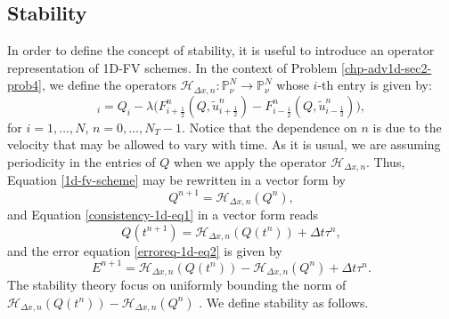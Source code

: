 \subsection{Stability}
\label{chp-adv1d-sub-stability}
In order to define the concept of stability, it is useful to introduce an operator
representation of 1D-FV schemes.
In the context of Problem \ref{chp-adv1d-sec2-prob4}, we define the operators
$\mathcal{H}_{\Delta x,n}: \mathbb{P}^{N}_{\nu} \to \mathbb{P}^{N}_{\nu}$ whose $i$-th entry is given by:
\begin{equation}
	[\mathcal{H}_{\Delta x,n}(Q)]_i = Q_i -
	\lambda \bigg({F}^n_{i+\frac{1}{2}}(Q,\tilde{u}^n_{i+\frac{1}{2}}) 
	- {F}^n_{i-\frac{1}{2}}(Q,\tilde{u}^n_{i-\frac{1}{2}}) \bigg),
\end{equation}
for $i=1, \ldots, N$, $n=0, \ldots, N_T-1$.
Notice that the dependence on $n$ is due to the velocity that may be allowed
to vary with time.
As it is usual, we are assuming periodicity in the entries of $Q$ when 
we apply the operator $\mathcal{H}_{\Delta x,n}$.
Thus, Equation \eqref{1d-fv-scheme} may be rewritten in a vector form by
\begin{equation*}
	Q^{n+1} = \mathcal{H}_{\Delta x,n}(Q^n),
\end{equation*}
and Equation \eqref{consistency-1d-eq1} in a vector form reads
\begin{equation*}
	Q(t^{n+1}) = \mathcal{H}_{\Delta x,n}(Q(t^n)) + \Delta t \tau^n,
\end{equation*}
and the error equation \eqref{erroreq-1d-eq2} is given by
\begin{equation}
	\label{erroreq-1d-eq3}
	E^{n+1} = \mathcal{H}_{\Delta x,n}(Q(t^n)) - \mathcal{H}_{\Delta x,n}(Q^n) +  \Delta t \tau^n.
\end{equation}
The stability theory focus on uniformly bounding the norm of $\mathcal{H}_{\Delta x,n}(Q(t^n)) - \mathcal{H}_{\Delta x,n}(Q^n)$ \citep{leveque:2002}.
We define stability as follows.

